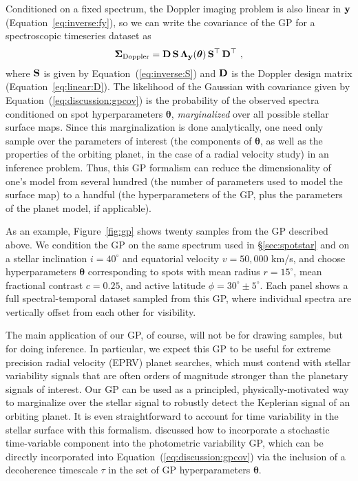 \documentclass[modern]{aastex631}
\begin{document}
Conditioned on a fixed spectrum, the Doppler imaging problem is also linear in ${\mathbf{y}}$ (Equation~\ref{eq:inverse:fy}), so we can write the covariance of the GP for a spectroscopic timeseries dataset as
%
\begin{align}
    \label{eq:discussion:gpcov}
    \boldsymbol{\Sigma}_\mathrm{Doppler} = \mathbf{D} \, \mathbf{S} \, \boldsymbol{\Lambda}_{\mathbf{y}} (\boldsymbol{\theta}) \, \mathbf{S}^\top \, \mathbf{D}^\top
    \hskip 0.33em,
\end{align}
%
where ${\mathbf{S}}$ is given by Equation~(\ref{eq:inverse:S}) and ${\mathbf{D}}$ is the Doppler design matrix (Equation~\ref{eq:linear:D}).
The likelihood of the Gaussian with covariance given by Equation~(\ref{eq:discussion:gpcov}) is the probability of the observed spectra conditioned on spot hyperparameters $\boldsymbol{\theta}$, \emph{marginalized} over all possible stellar surface maps.
Since this marginalization is done analytically, one need only sample over the parameters of interest (the components of $\boldsymbol{\theta}$, as well as the properties of the orbiting planet, in the case of a radial velocity study) in an inference problem.
Thus, this GP formalism can reduce the dimensionality of one's model from several hundred (the number of parameters used to model the surface map) to a handful (the hyperparameters of the GP, plus the parameters of the planet model, if applicable).

As an example, Figure~\ref{fig:gp} shows twenty samples from the GP described above. 
We condition the GP on the same spectrum used in \S\ref{sec:spotstar} and on a stellar inclination $i = 40^\circ$ and equatorial velocity $v = 50{,}000$ km/s, and choose hyperparameters $\boldsymbol{\theta}$ corresponding to spots with mean radius $r = 15^\circ$, mean fractional contrast $c = 0.25$, and active latitude $\phi = 30^\circ \pm 5^\circ$.
Each panel shows a full spectral-temporal dataset sampled from this GP, where individual spectra are vertically offset from each other for visibility.

The main application of our GP, of course, will not be for drawing samples, but for doing inference. 
In particular, we expect this GP to be useful for extreme precision radial velocity (EPRV) planet searches, which must contend with stellar variability signals that are often orders of magnitude stronger than the planetary signals of interest.
Our GP can be used as a principled, physically-motivated way to marginalize over the stellar signal to robustly detect the Keplerian signal of an orbiting planet.
It is even straightforward to account for time variability in the stellar surface with this formalism. \citet{Luger2021b} discussed how to incorporate a stochastic time-variable component into the photometric variability GP, which can be directly incorporated into Equation~(\ref{eq:discussion:gpcov}) via the inclusion of a decoherence timescale $\tau$ in the set of GP hyperparameters $\boldsymbol{\theta}$.
\end{document}
